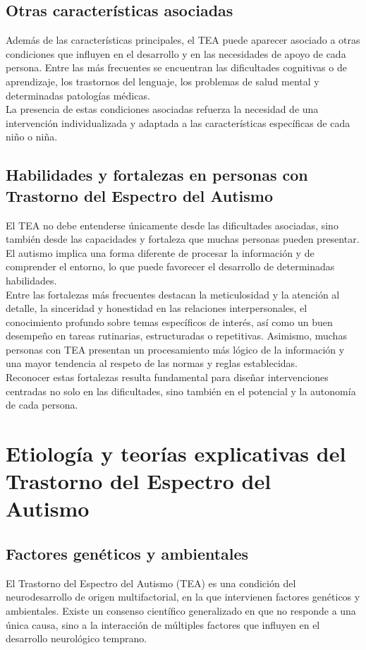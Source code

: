 \documentclass{article}
\begin{document}
\subsection{\textbf{Otras características asociadas}}
Además de las características principales, el TEA puede aparecer asociado a otras condiciones que influyen en el desarrollo y en las necesidades de apoyo de cada persona. Entre las más frecuentes se encuentran las dificultades cognitivas o de aprendizaje, los trastornos del lenguaje, los problemas de salud mental y determinadas patologías médicas.\\

La presencia de estas condiciones asociadas refuerza la necesidad de una intervención individualizada y adaptada a las características específicas de cada niño o niña. 

\subsection{\textbf{Habilidades y fortalezas en personas con Trastorno del Espectro del Autismo}}
El TEA no debe entenderse únicamente desde las dificultades asociadas, sino también desde las capacidades y fortaleza que muchas personas pueden presentar. El autismo implica una forma diferente de procesar la información y de comprender el entorno, lo que puede favorecer el desarrollo de determinadas habilidades.\\

Entre las fortalezas más frecuentes destacan la meticulosidad y la atención al detalle, la sinceridad y honestidad en las relaciones interpersonales, el conocimiento profundo sobre temas específicos de interés, así como un buen desempeño en tareas rutinarias, estructuradas o repetitivas. Asimismo, muchas personas con TEA presentan un procesamiento más lógico de la información y una mayor tendencia al respeto de las normas y reglas establecidas.\\

Reconocer estas fortalezas resulta fundamental para diseñar intervenciones centradas no solo en las dificultades, sino también en el potencial y la autonomía de cada persona.


\section{\textbf{Etiología y teorías explicativas del Trastorno del Espectro del Autismo}}
\subsection{\textbf{Factores genéticos y ambientales}}
El Trastorno del Espectro del Autismo (TEA) es una condición del neurodesarrollo de origen multifactorial, en la que intervienen factores genéticos y ambientales. Existe un consenso científico generalizado en que no responde a una única causa, sino a la interacción de múltiples factores que influyen en el desarrollo neurológico temprano.\\
\end{document}
